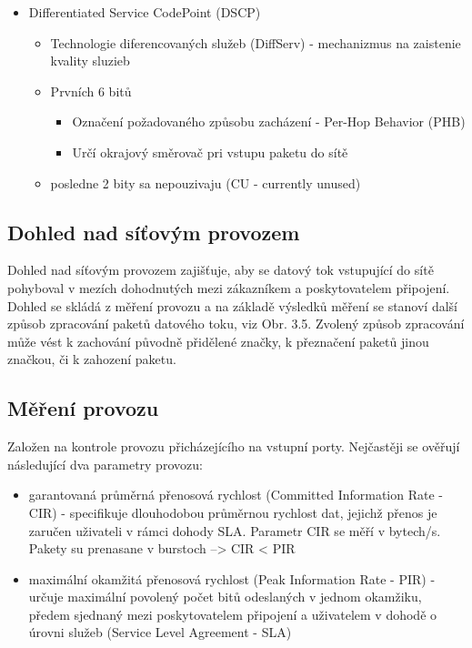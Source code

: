 \begin{itemize}
\item  Differentiated Service CodePoint (DSCP) 
\begin{itemize}
\item Technologie diferencovaných služeb (DiffServ) - mechanizmus na zaistenie kvality sluzieb 
\item Prvních 6 bitů
    \begin{itemize}
    \item Označení požadovaného způsobu zacházení - Per-Hop Behavior (PHB)
    \item Určí okrajový směrovač pri vstupu paketu do sítě 
    \end{itemize}
\item posledne 2 bity sa nepouzivaju (CU - currently unused)
\end{itemize}
\end{itemize}

\subsection{Dohled nad síťovým provozem}
Dohled nad síťovým provozem zajišťuje, aby se datový tok vstupující do sítě pohyboval
v mezích dohodnutých mezi zákazníkem a poskytovatelem připojení. Dohled se skládá
z měření provozu a na základě výsledků měření se stanoví další způsob zpracování paketů
datového toku, viz Obr. 3.5. Zvolený způsob zpracování může vést k zachování původně
přidělené značky, k přeznačení paketů jinou značkou, či k zahození paketu. 

\subsection{Měření provozu}
Založen na kontrole provozu přicházejícího na vstupní porty. Nejčastěji se ověřují následující dva parametry provozu:  
\begin{itemize}
\item garantovaná průměrná přenosová rychlost (Committed Information Rate - CIR) -  specifikuje dlouhodobou průměrnou
rychlost dat, jejichž přenos je zaručen uživateli v rámci dohody SLA. Parametr CIR se měří v bytech/s. Pakety su prenasane v burstoch --> CIR < PIR
\item maximální okamžitá přenosová rychlost (Peak Information Rate - PIR) - určuje maximální povolený počet bitů
odeslaných v jednom okamžiku, předem sjednaný mezi poskytovatelem připojení a uživatelem v dohodě o úrovni služeb (Service Level Agreement - SLA)
\end{itemize}
